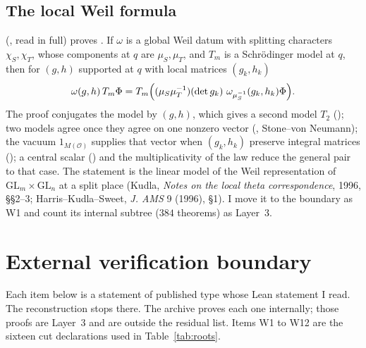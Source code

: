\documentclass[11pt]{article}
\newcommand{\GL}{\mathrm{GL}}
\begin{document}
\subsection{The local Weil formula}

 (, read in full) proves . If $\omega$ is a global Weil datum with splitting characters $\chi_S,\chi_T$, whose components at $q$ are $\mu_S,\mu_T$, and $T_m$ is a Schr\"odinger model at $q$, then for $(g,h)$ supported at $q$ with local matrices $(g_k,h_k)$
\[
\omega(g,h)\,T_m\Phi=T_m\Bigl((\mu_S\mu_T^{-1})(\det g_k)\ \omega_{\mu_S^{-1}}(g_k,h_k)\Phi\Bigr).
\]
The proof conjugates the model by $(g,h)$, which gives a second model $T_2$ (); two models agree once they agree on one nonzero vector (, Stone--von Neumann); the vacuum $1_{M(\mathcal O)}$ supplies that vector when $(g_k,h_k)$ preserve integral matrices (); a central scalar () and the multiplicativity of the law reduce the general pair to that case. The statement is the linear model of the Weil representation of $\GL_m\times\GL_n$ at a split place (Kudla, \emph{Notes on the local theta correspondence}, 1996, \S\S2--3; Harris--Kudla--Sweet, \emph{J. AMS} 9 (1996), \S1). I move it to the boundary as W1 and count its internal subtree ($384$ theorems) as Layer~3.

\section{External verification boundary}\label{sec:ext}

Each item below is a statement of published type whose Lean statement I read. The reconstruction stops there. The archive proves each one internally; those proofs are Layer~3 and are outside the residual list. Items W1 to W12 are the sixteen cut declarations used in Table~\ref{tab:roots}.
\end{document}
